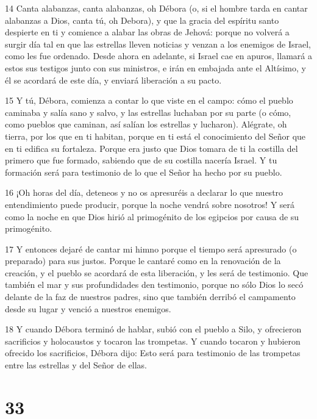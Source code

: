 \par 14 Canta alabanzas, canta alabanzas, oh Débora (o, si el hombre tarda en cantar alabanzas a Dios, canta tú, oh Debora), y que la gracia del espíritu santo despierte en ti y comience a alabar las obras de Jehová: porque no volverá a surgir día tal en que las estrellas lleven noticias y venzan a los enemigos de Israel, como les fue ordenado. Desde ahora en adelante, si Israel cae en apuros, llamará a estos sus testigos junto con sus ministros, e irán en embajada ante el Altísimo, y él se acordará de este día, y enviará liberación a su pacto.

\par 15 Y tú, Débora, comienza a contar lo que viste en el campo: cómo el pueblo caminaba y salía sano y salvo, y las estrellas luchaban por su parte (o cómo, como pueblos que caminan, así salían los estrellas y lucharon). Alégrate, oh tierra, por los que en ti habitan, porque en ti está el conocimiento del Señor que en ti edifica su fortaleza. Porque era justo que Dios tomara de ti la costilla del primero que fue formado, sabiendo que de su costilla nacería Israel. Y tu formación será para testimonio de lo que el Señor ha hecho por su pueblo.

\par 16 ¡Oh horas del día, deteneos y no os apresuréis a declarar lo que nuestro entendimiento puede producir, porque la noche vendrá sobre nosotros! Y será como la noche en que Dios hirió al primogénito de los egipcios por causa de su primogénito.

\par 17 Y entonces dejaré de cantar mi himno porque el tiempo será apresurado (o preparado) para sus justos. Porque le cantaré como en la renovación de la creación, y el pueblo se acordará de esta liberación, y les será de testimonio. Que también el mar y sus profundidades den testimonio, porque no sólo Dios lo secó delante de la faz de nuestros padres, sino que también derribó el campamento desde su lugar y venció a nuestros enemigos.

\par 18 Y cuando Débora terminó de hablar, subió con el pueblo a Silo, y ofrecieron sacrificios y holocaustos y tocaron las trompetas. Y cuando tocaron y hubieron ofrecido los sacrificios, Débora dijo: Esto será para testimonio de las trompetas entre las estrellas y del Señor de ellas.

\chapter{33}

